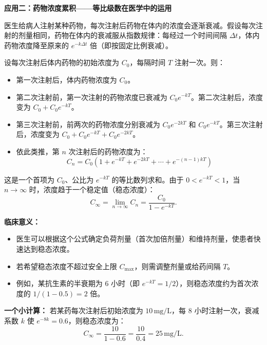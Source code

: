 \documentclass[fontset=fandol]{ctexart}
\newenvironment{custom}[1]{\par\noindent\textbf{#1}\quad}{\par\vspace{0.8em}}
\begin{document}
\begin{custom}{应用二：药物浓度累积——等比级数在医学中的运用}

医生给病人注射某种药物，每次注射后药物在体内的浓度会逐渐衰减。假设每次注射的剂量相同，药物在体内的衰减服从指数规律：每经过一个时间间隔 \(\Delta t\)，体内药物浓度降至原来的 \(e^{-k\Delta t}\) 倍（即按固定比例衰减）。

设每次注射后体内药物的初始浓度为 \(C_0\)，每隔时间 \(T\) 注射一次。则：
\begin{itemize}
\item 第一次注射后，体内药物浓度为 \(C_0\)。
\item 第二次注射前，第一次注射的药物浓度已衰减为 \(C_0 e^{-kT}\)。第二次注射后，浓度变为 \(C_0 + C_0 e^{-kT}\)。
\item 第三次注射前，前两次的药物浓度分别衰减为 \(C_0 e^{-2kT}\) 和 \(C_0 e^{-kT}\)。第三次注射后，浓度变为 \(C_0 + C_0 e^{-kT} + C_0 e^{-2kT}\)。
\item 依此类推，第 \(n\) 次注射后的药物浓度为：
\[
C_n = C_0 \left(1 + e^{-kT} + e^{-2kT} + \cdots + e^{-(n-1)kT}\right)
\]
\end{itemize}

这是一个首项为 \(C_0\)、公比为 \(e^{-kT}\) 的等比数列求和。由于 \(0 < e^{-kT} < 1\)，当 \(n \to \infty\) 时，浓度趋于一个稳定值（稳态浓度）：
\[
C_{\infty} = \lim_{n\to\infty} C_n = \frac{C_0}{1 - e^{-kT}}.
\]

\textbf{临床意义：}
\begin{itemize}
\item 医生可以根据这个公式确定负荷剂量（首次加倍剂量）和维持剂量，使患者快速达到稳态浓度。
\item 若希望稳态浓度不超过安全上限 \(C_{\max}\)，则需调整剂量或给药间隔 \(T\)。
\item 例如，某抗生素的半衰期为 6 小时（即 \(e^{-kT} = 1/2\)），则稳态浓度约为首次浓度的 \(1/(1-0.5)=2\) 倍。
\end{itemize}

\textbf{一个小计算：} 若某药每次注射后初始浓度为 \(10\,\text{mg/L}\)，每 8 小时注射一次，衰减系数 \(k\) 使 \(e^{-8k} = 0.6\)，则稳态浓度为：
\[
C_{\infty} = \frac{10}{1 - 0.6} = \frac{10}{0.4} = 25\,\text{mg/L}.
\]
\end{custom}
\end{document}
